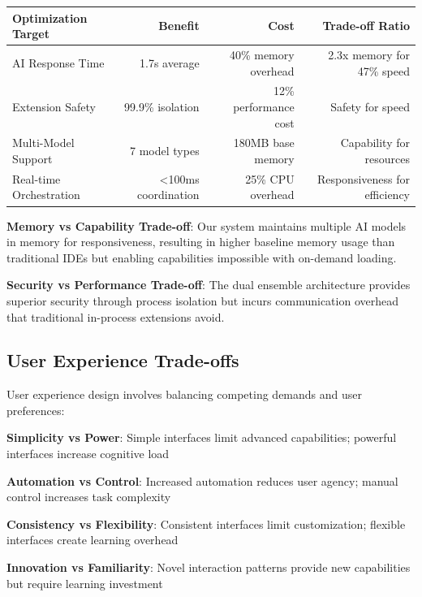 \begin{center}
\begin{tabular}{@{}lrrr@{}}
\toprule
\textbf{Optimization Target} & \textbf{Benefit} & \textbf{Cost} & \textbf{Trade-off Ratio} \\
\midrule
AI Response Time & 1.7s average & 40\% memory overhead & 2.3x memory for 47\% speed \\
Extension Safety & 99.9\% isolation & 12\% performance cost & Safety for speed \\
Multi-Model Support & 7 model types & 180MB base memory & Capability for resources \\
Real-time Orchestration & <100ms coordination & 25\% CPU overhead & Responsiveness for efficiency \\
\bottomrule
\end{tabular}
\end{center}

\textbf{Memory vs Capability Trade-off}:
Our system maintains multiple AI models in memory for responsiveness, resulting in higher baseline memory usage than traditional IDEs but enabling capabilities impossible with on-demand loading.

\textbf{Security vs Performance Trade-off}:
The dual ensemble architecture provides superior security through process isolation but incurs communication overhead that traditional in-process extensions avoid.

\subsection*{User Experience Trade-offs}

User experience design involves balancing competing demands and user preferences:

\begin{expandedlist}
    \item \textbf{Simplicity vs Power}: Simple interfaces limit advanced capabilities; powerful interfaces increase cognitive load
    \item \textbf{Automation vs Control}: Increased automation reduces user agency; manual control increases task complexity
    \item \textbf{Consistency vs Flexibility}: Consistent interfaces limit customization; flexible interfaces create learning overhead
    \item \textbf{Innovation vs Familiarity}: Novel interaction patterns provide new capabilities but require learning investment
\end{expandedlist}


